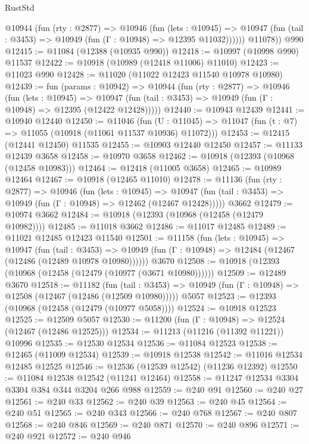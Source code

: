 \begin{lexlean}{RustStd}
\begin{coremodule}
{{{{{{{{{{{{{{{{{{{          @10944
            (fun (rty : @2877) =>
            @10946
              (fun (lets : @10945) =>
              @10947 (fun (tail : @3453) => @10949 (fun (Γ : @10948) => @12395 @11032))))))
        @11078))
    @990
@12415 := @11084 (@12388 (@10935 @990))
@12418 := @10997 (@10998 @990) @11537
@12422 := @10918 (@10989 (@12418 @11006) @11010)
@12423 := @11023 @990
@12428 := @11020 (@11022 @12423 @11540 @10978 @10980)
@12439 := fun (params : @10942) =>
  @10944
    (fun (rty : @2877) =>
    @10946
      (fun (lets : @10945) =>
      @10947 (fun (tail : @3453) => @10949 (fun (Γ : @10948) => @12395 (@12422 @12428)))))
@12440 := @10943 @12439
@12441 := @10940 @12440
@12450 := @11046
    (fun (U : @11045) => @11047 (fun (t : @7) => @11055 (@10918 (@11061 @11537 @10936) @11072)))
@12453 := @12415 (@12441 @12450) @11535
@12455 := @10903 @12440 @12450
@12457 := @11133 @12439 @3658
@12458 := @10970 @3658
@12462 := @10918 (@12393 (@10968 (@12458 @10983)))
@12464 := @12418 (@11005 @3658)
@12465 := @10989 @12464
@12467 := @10918 (@12465 @11010)
@12478 := @11136
    (fun (rty : @2877) =>
    @10946
      (fun (lets : @10945) =>
      @10947 (fun (tail : @3453) => @10949 (fun (Γ : @10948) => @12462 (@12467 @12428)))))
    @3662
@12479 := @10974 @3662
@12484 := @10918 (@12393 (@10968 (@12458 (@12479 @10982))))
@12485 := @11018 @3662
@12486 := @11017 @12485
@12489 := @11021 @12485 @12423 @11540
@12501 := @11158
    (fun (lets : @10945) =>
    @10947
      (fun (tail : @3453) =>
      @10949 (fun (Γ : @10948) => @12484 (@12467 (@12486 (@12489 @10978 @10980))))))
    @3670
@12508 := @10918 (@12393 (@10968 (@12458 (@12479 (@10977 (@3671 @10980))))))
@12509 := @12489 @3670
@12518 := @11182
    (fun (tail : @3453) => @10949 (fun (Γ : @10948) => @12508 (@12467 (@12486 (@12509 @10980)))))
    @5057
@12523 := @12393 (@10968 (@12458 (@12479 (@10977 @5058))))
@12524 := @10918 @12523
@12525 := @12509 @5057
@12530 := @11200 (fun (Γ : @10948) => @12524 (@12467 (@12486 @12525)))
@12534 := @11213 (@11216 (@11392 @11221)) @10996
@12535 := @12530 @12534
@12536 := @11084 @12523
@12538 := @12465 (@11009 @12534)
@12539 := @10918 @12538
@12542 := @11016 @12534 @12485 @12525
@12546 := @12536 (@12539 @12542) (@11236 @12392)
@12550 := @11084 @12538 @12542 (@11241 @12464)
@12558 := @11247 @12534 @3304 @3304 @384 @344 @3204 @266 @988
@12559 := @240 @91
@12560 := @240 @27
@12561 := @240 @33
@12562 := @240 @39
@12563 := @240 @45
@12564 := @240 @51
@12565 := @240 @343
@12566 := @240 @768
@12567 := @240 @807
@12568 := @240 @846
@12569 := @240 @871
@12570 := @240 @896
@12571 := @240 @921
@12572 := @240 @946
}}}}}}}}}}}}}}}}}}}
\end{coremodule}
\end{lexlean}
